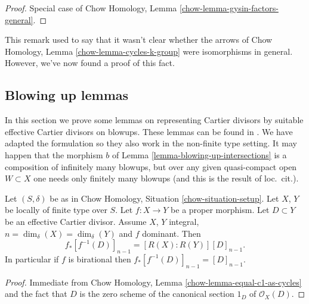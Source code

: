 \begin{proof}
Special case of Chow Homology, Lemma \ref{chow-lemma-gysin-factors-general}.
\end{proof}

\begin{remark}
\label{remark-not-true-not-quasi-compact}
This remark used to say that it wasn't clear whether the arrows
of Chow Homology, Lemma \ref{chow-lemma-cycles-k-group} were isomorphisms
in general. However, we've now found a proof of this fact.
\end{remark}







\subsection{Blowing up lemmas}
\label{section-blowing-up-lemmas}

\noindent
In this section we prove some lemmas on representing
Cartier divisors by suitable effective Cartier divisors
on blowups. These lemmas can be found in \cite[Section 2.4]{F}.
We have adapted the formulation so they also work
in the non-finite type setting. It may happen that the morphism $b$
of Lemma \ref{lemma-blowing-up-intersections} is a composition of
infinitely many blowups, but over any given quasi-compact open
$W \subset X$ one needs only finitely many blowups
(and this is the result of loc.\ cit.).

\begin{lemma}
\label{lemma-push-pull-effective-Cartier}
Let $(S, \delta)$ be as in Chow Homology, Situation \ref{chow-situation-setup}.
Let $X$, $Y$ be locally of finite type over $S$.
Let $f : X \to Y$ be a proper morphism.
Let $D \subset Y$ be an effective Cartier divisor.
Assume $X$, $Y$ integral, $n = \dim_\delta(X) = \dim_\delta(Y)$ and
$f$ dominant. Then
$$
f_*[f^{-1}(D)]_{n - 1} = [R(X) : R(Y)] [D]_{n - 1}.
$$
In particular if $f$ is birational then $f_*[f^{-1}(D)]_{n - 1} = [D]_{n - 1}$.
\end{lemma}

\begin{proof}
Immediate from Chow Homology, Lemma \ref{chow-lemma-equal-c1-as-cycles}
and the fact that $D$ is the zero
scheme of the canonical section $1_D$ of $\mathcal{O}_X(D)$.
\end{proof}

